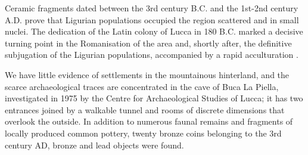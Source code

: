 \documentclass[sustainability,article,submit,pdftex,moreauthors]{Definitions/mdpi}
\begin{document}
Ceramic fragments dated between the 3rd century B.C. and the 1st-2nd century A.D. prove that Ligurian populations occupied the region scattered and in small nuclei. The dedication of the Latin colony of Lucca in 180 B.C. marked a decisive turning point in the Romanisation of the area and, shortly after, the definitive subjugation of the Ligurian populations, accompanied by a rapid acculturation \cite{gia96, cia05}.

We have little evidence of settlements in the mountainous hinterland, and the scarce archaeological traces are concentrated in the cave of Buca La Piella, investigated in 1975 by the Centre for Archaeological Studies of Lucca; it has two entrances joined by a walkable tunnel and rooms of discrete dimensions that overlook the outside. In addition to numerous faunal remains and fragments of locally produced common pottery, twenty bronze coins belonging to the 3rd century AD, bronze and lead objects were found. 





\end{document}
